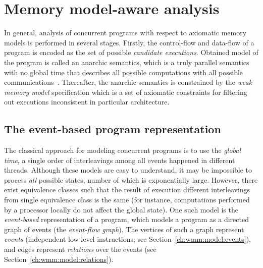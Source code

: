 \chapter{Memory model-aware analysis}
\label{ch:wmm}

In general, analysis of concurrent programs with respect to axiomatic memory models is performed in several stages. %
Firstly, the control-flow and data-flow of a program is encoded as the set of possible \textit{candidate executions}. %
Obtained model of the program is called an anarchic semantics, which is a truly parallel semantics with no global time that describes all possible computations with all possible communications~\cite{alglave2016syntax}. Thereafter, the anarchic semantics is constrained by the \textit{weak memory model} specification which is a set of axiomatic constraints for filtering out executions inconsistent in particular architecture.


\section{The event-based program representation}
\label{ch:wmm:event}

The classical approach for modeling concurrent programs is to use the \textit{global time}, a single order of interleavings among all events happened in different threads.
Although these models are easy to understand, it may be impossible to process \textit{all} possible states, number of which is exponentially large.
However, there exist equivalence classes such that the result of execution different interleavings from single equivalence class is the same (for instance, computations performed by a processor locally do not affect the global state).
One such model is the \textit{event-based} representation of a program, which models a program as a directed graph of events (the \textit{event-flow graph}).
The vertices of such a graph represent \textit{events} (independent low-level instructions; see Section~\ref{ch:wmm:model:events}), and edges represent \textit{relations} over the events (see Section~\ref{ch:wmm:model:relations}).

